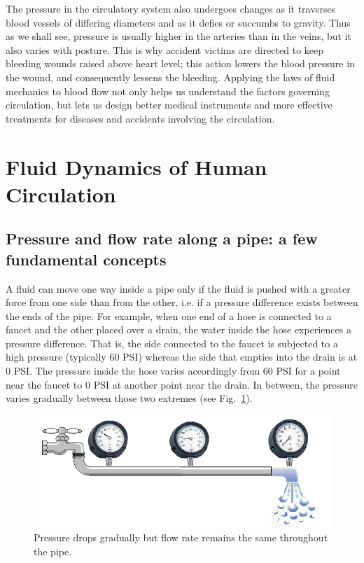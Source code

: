 The pressure in the circulatory system also undergoes changes as it traverses blood vessels of differing diameters and as it defies or succumbs to gravity.  Thus as we shall see, pressure is usually higher in the arteries than in the veins, but it also varies with posture. This is why accident victims are directed to keep bleeding wounds raised above heart level; this action lowers the blood pressure in the wound, and consequently lessens the bleeding.  
Applying the laws of fluid mechanics to blood flow not only helps us understand the factors governing circulation, but lets us design better medical instruments and more effective treatments for diseases and accidents involving the circulation.  

\section{Fluid Dynamics of Human Circulation}

\subsection{Pressure and flow rate along a pipe: a few fundamental concepts} 

A fluid can move one way inside a pipe only if the fluid is pushed with a greater force from one side than from the other, i.e. if a pressure difference exists between the ends of the pipe. For example, when one end of a hose is connected to a faucet and the other placed over a drain, the water inside the hose experiences a pressure difference. That is, the side connected to the faucet is subjected to a high pressure (typically 60 PSI) whereas the side that empties into the drain is at 0 PSI. The pressure inside the hose varies accordingly from 60 PSI for a point near the faucet to 0 PSI at another point near the drain. In between, the pressure varies gradually between those two extremes (see Fig.~\ref{Fig2-1}).
\begin{figure}[htb]
	\centering
	\includegraphics[width=\textwidth]{./figures/Topic2/Fig2-1.png}
	\caption{Pressure drops gradually but flow rate remains the same throughout the pipe.}
	\label{Fig2-1}
\end{figure}

